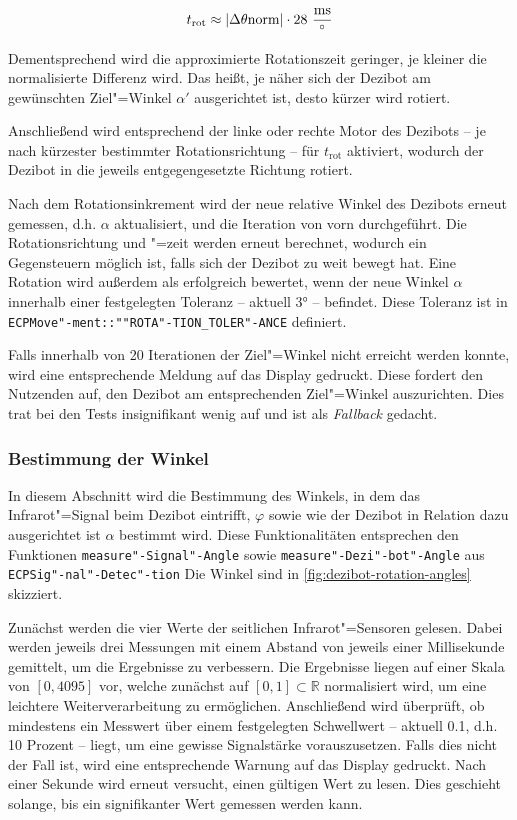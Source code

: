 \begin{equation*}
    t_{\text{rot}} \approx \vert\Delta\theta{\text{norm}}\vert \cdot 28~\frac{\text{ms}}{^\circ}
\end{equation*}

Dementsprechend wird die approximierte Rotationszeit geringer, je kleiner die normalisierte Differenz wird. Das heißt, je näher sich der Dezibot am gewünschten Ziel"=Winkel $\alpha'$ ausgerichtet ist, desto kürzer wird rotiert.

Anschließend wird entsprechend der linke oder rechte Motor des Dezibots -- je nach kürzester bestimmter Rotationsrichtung -- für $t_{\text{rot}}$ aktiviert, wodurch der Dezibot in die jeweils entgegengesetzte Richtung rotiert.

Nach dem Rotationsinkrement wird der neue relative Winkel des Dezibots erneut gemessen, d.h. $\alpha$ aktualisiert, und die Iteration von vorn durchgeführt. Die Rotationsrichtung und "=zeit werden erneut berechnet, wodurch ein Gegensteuern möglich ist, falls sich der Dezibot zu weit bewegt hat. Eine Rotation wird außerdem als erfolgreich bewertet, wenn der neue Winkel $\alpha$ innerhalb einer festgelegten Toleranz -- aktuell 3° -- befindet. Diese Toleranz ist in \texttt{ECPMove"-ment::""ROTA"-TION\_TOLER"-ANCE} definiert.

Falls innerhalb von 20 Iterationen der Ziel"=Winkel nicht erreicht werden konnte, wird eine entsprechende Meldung auf das Display gedruckt. Diese fordert den Nutzenden auf, den Dezibot am entsprechenden Ziel"=Winkel auszurichten. Dies trat bei den Tests insignifikant wenig auf und ist als \emph{Fallback} gedacht.


\subsubsection{Bestimmung der Winkel}
\label{sec:angle-determination}

In diesem Abschnitt wird die Bestimmung des Winkels, in dem das Infrarot"=Signal beim Dezibot eintrifft, $\varphi$ sowie wie der Dezibot in Relation dazu ausgerichtet ist $\alpha$ bestimmt wird. Diese Funktionalitäten entsprechen den Funktionen \texttt{measure"-Signal"-Angle} sowie \texttt{measure"-Dezi"-bot"-Angle} aus \texttt{ECPSig"-nal"-Detec"-tion} Die Winkel sind in \autoref{fig:dezibot-rotation-angles} skizziert.

Zunächst werden die vier Werte der seitlichen Infrarot"=Sensoren gelesen. Dabei werden jeweils drei Messungen mit einem Abstand von jeweils einer Millisekunde gemittelt, um die Ergebnisse zu verbessern. Die Ergebnisse liegen auf einer Skala von $[0,4095]$ vor, welche zunächst auf $[0,1] \subset \mathbb{R}$ normalisiert wird, um eine leichtere Weiterverarbeitung zu ermöglichen. Anschließend wird überprüft, ob mindestens ein Messwert über einem festgelegten Schwellwert -- aktuell 0.1, d.h. 10 Prozent -- liegt, um eine gewisse Signalstärke vorauszusetzen. Falls dies nicht der Fall ist, wird eine entsprechende Warnung auf das Display gedruckt. Nach einer Sekunde wird erneut versucht, einen gültigen Wert zu lesen. Dies geschieht solange, bis ein signifikanter Wert gemessen werden kann.

